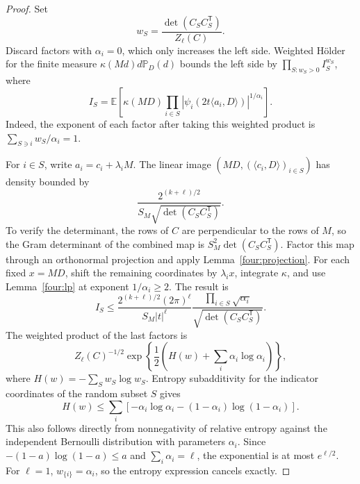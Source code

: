 \begin{proof}
Set
\[
 w_S=\frac{\det(C_SC_S^{\mathsf T})}{Z_\ell(C)}.
\]
Discard factors with \(\alpha_i=0\), which only increases
the left side.  Weighted H\"older for the finite measure
\(\kappa(Md)d\mathbb P_D(d)\) bounds the left side by
\(\prod_{S:w_S>0}I_S^{w_S}\), where
\[
 I_S=\mathbb E\left[\kappa(MD)
       \prod_{i\in S}
       |\psi_i(2t\langle a_i,D\rangle)|^{1/\alpha_i}\right].
\]
Indeed, the exponent of each factor after taking this
weighted product is
\(\sum_{S\ni i}w_S/\alpha_i=1\).

For \(i\in S\), write \(a_i=c_i+\lambda_iM\).
The linear image
\((MD,(\langle c_i,D\rangle)_{i\in S})\) has density
bounded by
\[
 \frac{2^{(k+\ell)/2}}
 {S_M\sqrt{\det(C_SC_S^{\mathsf T})}}.
\]
To verify the determinant, the rows of \(C\) are
perpendicular to the rows of \(M\), so the Gram determinant
of the combined map is
\(S_M^2\det(C_SC_S^{\mathsf T})\).
Factor this map through an orthonormal projection and
apply Lemma~\ref{four:projection}.
For each fixed \(x=MD\), shift the remaining coordinates
by \(\lambda_i x\), integrate \(\kappa\), and use
Lemma~\ref{four:lp} at exponent \(1/\alpha_i\geq2\).
The result is
\[
 I_S\leq
 \frac{2^{(k+\ell)/2}(2\pi)^\ell}
 {S_M|t|^\ell}
 \frac{\prod_{i\in S}\sqrt{\alpha_i}}
 {\sqrt{\det(C_SC_S^{\mathsf T})}}.
\]
The weighted product of the last factors is
\[
 Z_\ell(C)^{-1/2}
 \exp\left\{\frac12\left(
       H(w)+\sum_i\alpha_i\log\alpha_i\right)\right\},
\]
where \(H(w)=-\sum_Sw_S\log w_S\).
Entropy subadditivity for the indicator coordinates of
the random subset \(S\) gives
\[
 H(w)\leq\sum_i\left[-\alpha_i\log\alpha_i
 -(1-\alpha_i)\log(1-\alpha_i)\right].
\]
This also follows directly from nonnegativity of relative
entropy against the independent Bernoulli distribution
with parameters \(\alpha_i\).
Since \(-(1-a)\log(1-a)\leq a\) and
\(\sum_i\alpha_i=\ell\), the exponential is at most
\(e^{\ell/2}\).  For \(\ell=1\), \(w_{\{i\}}=\alpha_i\),
so the entropy expression cancels exactly.
\end{proof}

